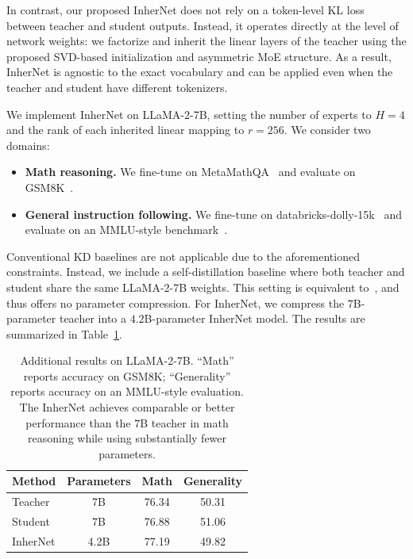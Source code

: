\documentclass{article} %
\begin{document}
In contrast, our proposed InherNet does not rely on a token-level KL loss between teacher and student outputs. Instead, it operates directly at the level of network weights: we factorize and inherit the linear layers of the teacher using the proposed SVD-based initialization and asymmetric MoE structure. As a result, InherNet is agnostic to the exact vocabulary and can be applied even when the teacher and student have different tokenizers.

We implement InherNet on LLaMA-2-7B, setting the number of experts to $H = 4$ and the rank of each inherited linear mapping to $r = 256$. We consider two domains:
\begin{itemize}[leftmargin=*, topsep=2pt, itemsep=2pt]
\item \textbf{Math reasoning.}
We fine-tune on MetaMathQA~\cite{yu2023metamath} and evaluate on GSM8K~\cite{cobbe2021training}.
\item \textbf{General instruction following.}
We fine-tune on databricks-dolly-15k~\cite{conover2023free} and evaluate on an MMLU-style benchmark~\cite{hendrycks2020measuring}.
\end{itemize}

Conventional KD baselines are not applicable due to the aforementioned constraints. Instead, we include a self-distillation baseline where both teacher and student share the same LLaMA-2-7B weights. This setting is equivalent to~\cite{zhang2019your}, and thus offers no parameter compression. For InherNet, we compress the $7$B-parameter teacher into a $4.2$B-parameter InherNet model. The results are summarized in Table~\ref{tab:llama-inhernet}.


\begin{table}[t]
\centering
\caption{Additional results on LLaMA-2-7B. ``Math'' reports accuracy on GSM8K; ``Generality'' reports accuracy on an MMLU-style evaluation. The InherNet achieves comparable or better performance than the $7$B teacher in math reasoning while using substantially fewer parameters.}
\vspace{-0.3cm}
\label{tab:llama-inhernet}
\begin{tabular}{lccc}
\toprule[1.2pt]
Method & Parameters & Math & Generality \\
\midrule
Teacher & 7B   & 76.34 & 50.31 \\
Student & 7B   & 76.88 & 51.06 \\
InherNet & 4.2B & 77.19 & 49.82 \\
\bottomrule[1.2pt]
\end{tabular}
\end{table}
\end{document}
